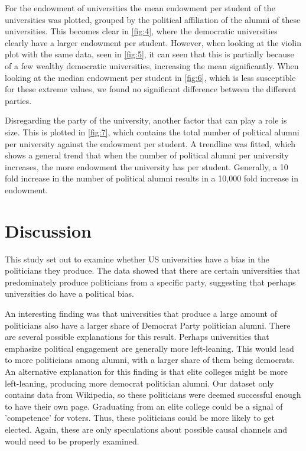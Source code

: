 \documentclass{article}
\begin{document}
For the endowment of universities the mean endowment per student of the universities was plotted, grouped by the political affiliation of the alumni of these universities. This becomes clear in \autoref{fig:4}, where the democratic universities clearly have a larger endowment per student. However, when looking at the violin plot with the same data, seen in \autoref{fig:5}, it can seen that this is partially because of a few wealthy democratic universities, increasing the mean significantly. When looking at the median endowment per student in \autoref{fig:6}, which is less susceptible for these extreme values, we found no significant difference between the different parties.

Disregarding the party of the university, another factor that can play a role is size. This is plotted in \autoref{fig:7}, which contains the total number of political alumni per university against the endowment per student. A trendline was fitted, which shows a general trend that when the number of political alumni per university increases, the more endowment the university has per student. Generally, a 10 fold increase in the number of political alumni results in a 10,000 fold increase in endowment.

\section{Discussion} 

This study set out to examine whether US universities have a bias in the politicians they produce. The data showed that there are certain universities that predominately produce politicians from a specific party, suggesting that perhaps universities do have a political bias. 

An interesting finding was that universities that produce a large amount of politicians also have a larger share of Democrat Party politician alumni.  There are several possible explanations for this result. Perhaps universities that emphasize political engagement are generally more left-leaning. This would lead to more politicians among alumni, with a larger share of them being democrats. An alternative explanation for this finding is that elite colleges might be more left-leaning, producing more democrat politician alumni. Our dataset only contains data from Wikipedia, so these politicians were deemed successful enough to have their own page. Graduating from an elite college could be a signal of 'competence' for voters. Thus, these politicians could be more likely to get elected. Again, these are only speculations about possible causal channels and would need to be properly examined.
\end{document}
